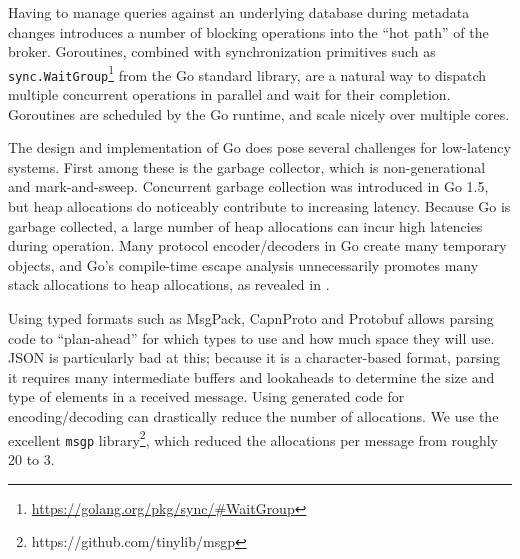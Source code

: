 Having to manage queries against an underlying database during metadata changes introduces a number of blocking operations into the ``hot path'' of the broker.
Goroutines, combined with synchronization primitives such as \texttt{sync.WaitGroup}\footnote{\url{https://golang.org/pkg/sync/#WaitGroup}} from the Go standard library, are a natural way to dispatch multiple concurrent operations in parallel and wait for their completion.
Goroutines are scheduled by the Go runtime, and scale nicely over multiple cores.

The design and implementation of Go does pose several challenges for low-latency systems.
First among these is the garbage collector, which is non-generational and mark-and-sweep.
Concurrent garbage collection was introduced in Go 1.5, but heap allocations do noticeably contribute to increasing latency.
Because Go is garbage collected, a large number of heap allocations can incur high latencies during
operation.
Many protocol encoder/decoders in Go create many temporary objects, and Go's compile-time escape analysis unnecessarily promotes many stack allocations to heap allocations, as revealed
in \cite{goescape}.

Using typed formats such as MsgPack, CapnProto and Protobuf allows parsing code to ``plan-ahead'' for which types to use and how much space they will use.
JSON is particularly bad at this; because it is a character-based format, parsing it requires many intermediate buffers and lookaheads to determine the size and type of elements in a received message.
Using generated code for encoding/decoding can drastically reduce the number of allocations. We use the excellent \texttt{msgp} library\footnote{https://github.com/tinylib/msgp}, which reduced the allocations per message from roughly 20 to 3.




